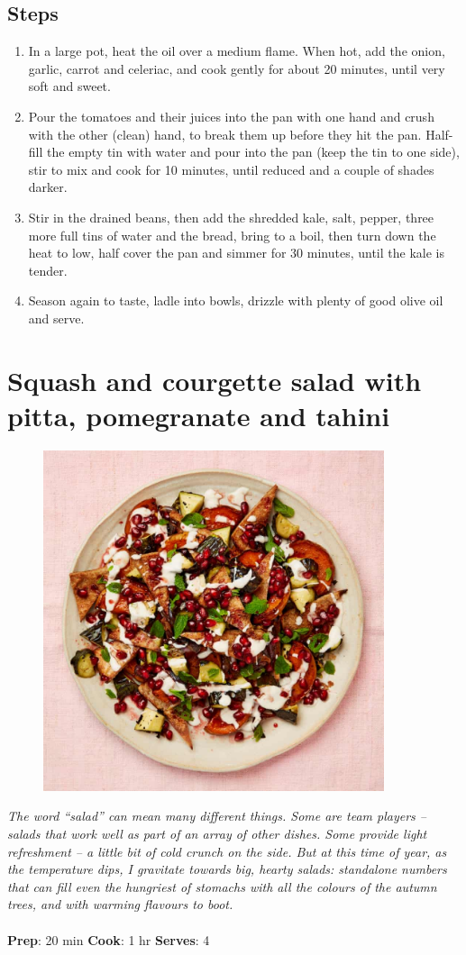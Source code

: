 \documentclass{book}
\begin{document}
\subsection*{Steps}
\begin{enumerate}
\item In a large pot, heat the oil over a medium flame. When hot, add the onion, garlic, carrot and celeriac, and cook gently for about 20 minutes, until very soft and sweet.
\item Pour the tomatoes and their juices into the pan with one hand and crush with the other (clean) hand, to break them up before they hit the pan. Half-fill the empty tin with water and pour into the pan (keep the tin to one side), stir to mix and cook for 10 minutes, until reduced and a couple of shades darker.
\item Stir in the drained beans, then add the shredded kale, salt, pepper, three more full tins of water and the bread, bring to a boil, then turn down the heat to low, half cover the pan and simmer for 30 minutes, until the kale is tender.
\item Season again to taste, ladle into bowls, drizzle with plenty of good olive oil and serve.
\end{enumerate}
\newpage

\section{Squash and courgette salad with pitta, pomegranate and tahini}
\begin{figure}
\centering\includegraphics[width=10cm,height=10cm,keepaspectratio]{Recipe_Pictures/Squash_and_courgette_salad_with_pitta,_pomegranate_and_tahini.png}
\end{figure}
\emph{The word “salad” can mean many different things. Some are team players – salads that work well as part of an array of other dishes. Some provide light refreshment – a little bit of cold crunch on the side. But at this time of year, as the temperature dips, I gravitate towards big, hearty salads: standalone numbers that can fill even the hungriest of stomachs with all the colours of the autumn trees, and with warming flavours to boot.}\\\\ 
\textbf{Prep}: 20 min
\textbf{Cook}: 1 hr
\textbf{Serves}: 4
\end{document}
